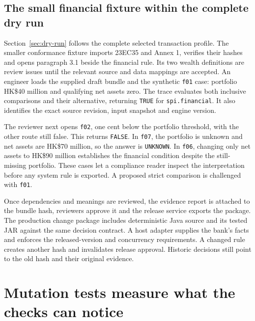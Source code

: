 \subsection{The small financial fixture within the complete dry run}
\label{merge:P-03c-storage-review:01}


Section~\ref{sec:dry-run} follows the complete selected transaction profile.
The smaller conformance fixture imports 23EC35 and Annex 1, verifies their hashes and
opens paragraph 3.1 beside the financial rule. Its two wealth definitions are
review issues until the relevant source and data mappings are accepted. An
engineer loads the supplied draft bundle and the synthetic \texttt{f01} case:
portfolio HK\$40 million and qualifying net assets zero. The trace evaluates
both inclusive comparisons and their alternative, returning \texttt{TRUE} for
\texttt{spi.financial}. It also identifies the exact source revision, input
snapshot and engine version.


The reviewer next opens \texttt{f02}, one cent below the portfolio threshold,
with the other route still false. This returns \texttt{FALSE}. In \texttt{f07},
the portfolio is unknown and net assets are HK\$70 million, so the answer is
\texttt{UNKNOWN}. In \texttt{f06}, changing only net assets to HK\$90 million
establishes the financial condition despite the still-missing portfolio. These
cases let a compliance reader inspect the interpretation before any system rule
is exported. A proposed strict comparison is challenged with \texttt{f01}.

Once dependencies and meanings are reviewed, the evidence report is attached to
the bundle hash, reviewers approve it and the release service exports the package.
The production change package includes deterministic Java source and its tested
JAR against the same decision contract. A host adapter supplies the bank's
facts and enforces the released-version and concurrency requirements.
A changed rule creates another hash and invalidates release approval. Historic
decisions still point to the old hash and their original evidence.

\section{Mutation tests measure what the checks can notice}
\label{merge:M07:06}


